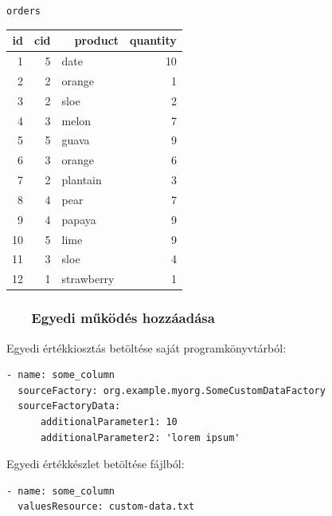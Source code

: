 \documentclass[
]{beamer}
\newcommand{\slidetitle}[2]{\frametitle{{\small #1 ~ \ding{226} ~ } \normalsize \textbf{#2} }}
\begin{document}
\begin{frame}
\begin{minipage}[c]{0.45\textwidth}
        \vspace{0.5cm}
        
        \normalsize \texttt{orders}
        \vspace{0.1cm}
        
        \tiny
        \begin{tabular}{ |r|r|l|r| }
        \hline
            id & cid & ~~product & quantity \\
        \hline
            1 & 5 & date & 10 \\
            2 & 2 & orange & 1 \\
            3 & 2 & sloe & 2 \\
            4 & 3 & melon & 7 \\
            5 & 5 & guava & 9 \\
            6 & 3 & orange & 6 \\
            7 & 2 & plantain & 3 \\
            8 & 4 & pear & 7 \\
            9 & 4 & papaya & 9 \\
            10 & 5 & lime & 9 \\
            11 & 3 & sloe & 4 \\
            12 & 1 & strawberry & 1 \\
        \hline
        \end{tabular}
    \end{minipage}
\end{frame}

\begin{frame}[containsverbatim]
    \slidetitle{\sectionshorttitle}{Egyedi működés hozzáadása}
    
    Egyedi értékkiosztás betöltése saját programkönyvtárból:
    
    \vspace{0.3em}
    
    \begin{verbatim}
- name: some_column
  sourceFactory: org.example.myorg.SomeCustomDataFactory
  sourceFactoryData:
      additionalParameter1: 10
      additionalParameter2: 'lorem ipsum'
    \end{verbatim}
    
    \vspace{0.7em}
    
    Egyedi értékkészlet betöltése fájlból:
    
    \vspace{0.3em}
    
    \begin{verbatim}
- name: some_column
  valuesResource: custom-data.txt
    \end{verbatim}
    
\end{frame}
\end{document}
